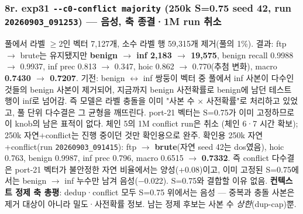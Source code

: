 \subsubsection{8r. exp31 \texttt{-\allowbreak{}-\allowbreak{}c0-\allowbreak{}con\allowbreak{}flict ma\allowbreak{}jority} (250k S=\allowbreak{}0.75 seed 42, run \texttt{20260903\allowbreak{}\_\allowbreak{}\allowbreak{}091253}) — \textbf{음성, 축 종결·1M run 취소}}
풀에서 라벨 \ensuremath{\geq}2인 벡터 7,127개, 소수 라벨 행 59,315개 제거(풀의 1\%). 결과: ftp \ensuremath{\rightarrow} brute는 유지됐지만 \textbf{benign \ensuremath{\rightarrow} inf 2,183  \ensuremath{\rightarrow}  19,575}, benign recall 0.9988  \ensuremath{\rightarrow}  0.9937, inf prec 0.813  \ensuremath{\rightarrow}  0.347, hoic 0.862  \ensuremath{\rightarrow}  0.770(추첨 변화), macro \textbf{0.7430  \ensuremath{\rightarrow}  0.7207}. 기전: benign \ensuremath{\leftrightarrow} inf 쌍둥이 벡터 중 풀에서 inf 사본이 다수인 것들의 benign 사본이 제거되어, 지금까지 benign 사전확률로 benign에 남던 테스트 행이 inf로 넘어감. 즉 모델은 라벨 충돌을 이미 "사본 수 × 사전확률"로 처리하고 있었고, 풀 단위 다수결은 그 균형을 깨뜨린다. port-21 벡터는 S=\allowbreak{}0.75가 이미 고정하므로 이 knob의 남은 표적이 없다. 체인 5의 1M conflict run은 취소 (체인 6·7 시간 확보); 250k 자연+\allowbreak{}conflict는 진행 중이던 것만 확인용으로 완주. 확인용 250k 자연+\allowbreak{}conflict(run \texttt{20260903\allowbreak{}\_\allowbreak{}\allowbreak{}091415}): ftp \ensuremath{\rightarrow} \textbf{brute}(자연 seed 42는 dos였음), hoic 0.763, benign 0.9987, inf prec 0.796, macro 0.6515  \ensuremath{\rightarrow}  \textbf{0.7332}. 즉 conflict 다수결은 port-21 벡터가 불안정한 자연 비율에서는 양성(+\allowbreak{}0.08)이고, 이미 고정된 S=\allowbreak{}0.75에서는 benign \ensuremath{\rightarrow} inf 누수만 남겨 음성(−0.022). S=\allowbreak{}0.75와 결합할 이유 없음. \textbf{컨텍스트 정제 축 총평}: dedup·conflict 모두 S=\allowbreak{}0.75 위에서는 음성 — 중복과 충돌 사본은 제거 대상이 아니라 밀도·사전확률 정보. 남는 정제 후보는 사본 수 \emph{상한}(dup-cap)뿐.

